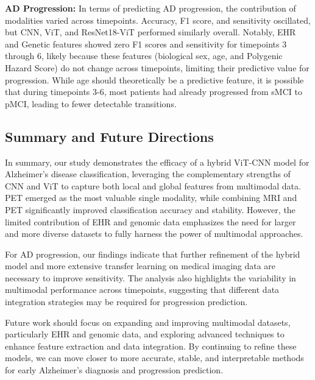 \textbf{AD Progression:} In terms of predicting AD progression, the contribution of modalities varied across timepoints. Accuracy, F1 score, and sensitivity oscillated, but CNN, ViT, and ResNet18-ViT performed similarly overall. Notably, EHR and Genetic features showed zero F1 scores and sensitivity for timepoints 3 through 6, likely because these features (biological sex, age, and Polygenic Hazard Score) do not change across timepoints, limiting their predictive value for progression. While age should theoretically be a predictive feature, it is possible that during timepoints 3-6, most patients had already progressed from sMCI to pMCI, leading to fewer detectable transitions.

\subsection{Summary and Future Directions}

In summary, our study demonstrates the efficacy of a hybrid ViT-CNN model for Alzheimer’s disease classification, leveraging the complementary strengths of CNN and ViT to capture both local and global features from multimodal data. PET emerged as the most valuable single modality, while combining MRI and PET significantly improved classification accuracy and stability. However, the limited contribution of EHR and genomic data emphasizes the need for larger and more diverse datasets to fully harness the power of multimodal approaches.

For AD progression, our findings indicate that further refinement of the hybrid model and more extensive transfer learning on medical imaging data are necessary to improve sensitivity. The analysis also highlights the variability in multimodal performance across timepoints, suggesting that different data integration strategies may be required for progression prediction.

Future work should focus on expanding and improving multimodal datasets, particularly EHR and genomic data, and exploring advanced techniques to enhance feature extraction and data integration. By continuing to refine these models, we can move closer to more accurate, stable, and interpretable methods for early Alzheimer’s diagnosis and progression prediction.